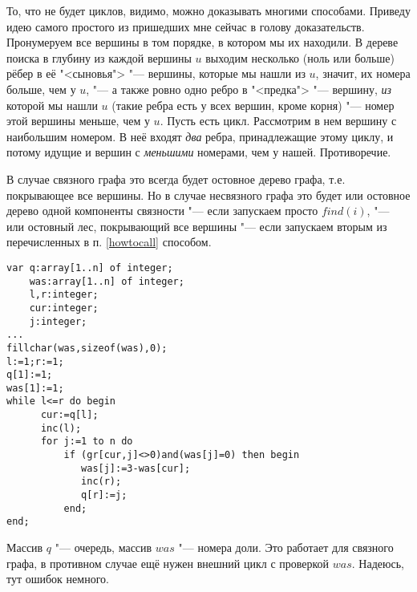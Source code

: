 \cleardoublepage
{}
 То, что не будет циклов, видимо, можно доказывать многими способами. Приведу идею
самого простого из пришедших мне сейчас в голову доказательств. Пронумеруем все вершины в том порядке, 
в котором мы их находили. В дереве поиска в глубину из каждой вершины $u$ выходим несколько (ноль или больше)
рёбер в её "<сыновья"> "--- вершины, которые мы нашли из $u$, значит, их номера больше, чем у $u$, "---
а также ровно одно ребро в "<предка"> "--- вершину, \textit{из} которой мы нашли $u$ (такие ребра есть
у всех вершин, кроме корня) "--- номер этой вершины меньше, чем у $u$. Пусть есть цикл. Рассмотрим в нем вершину с 
наибольшим номером. В неё входят \textit{два} ребра, принадлежащие этому циклу, и потому идущие и вершин с \textit{меньшими}
номерами, чем у нашей. Противоречие.

В случае связного графа это всегда будет остовное дерево графа, т.е. покрывающее все вершины. Но в случае
несвязного графа это будет или остовное дерево одной компоненты связности "--- если запускаем просто $find(i)$,
"--- или остовный лес, покрывающий все вершины "--- если запускаем вторым из перечисленных в п. \ref{howtocall}
способом.




\begin{codesample}\begin{verbatim}
var q:array[1..n] of integer;
    was:array[1..n] of integer;
    l,r:integer;
    cur:integer;
    j:integer;
...
fillchar(was,sizeof(was),0);
l:=1;r:=1;
q[1]:=1;
was[1]:=1;
while l<=r do begin
      cur:=q[l];
      inc(l);
      for j:=1 to n do
          if (gr[cur,j]<>0)and(was[j]=0) then begin
             was[j]:=3-was[cur];
             inc(r);
             q[r]:=j;
          end;
end;
\end{verbatim}
\end{codesample}
Массив $q$ "--- очередь, массив $was$ "--- номера доли. Это работает для связного графа, в противном случае ещё
нужен внешний цикл с проверкой $was$. Надеюсь, тут ошибок немного.

